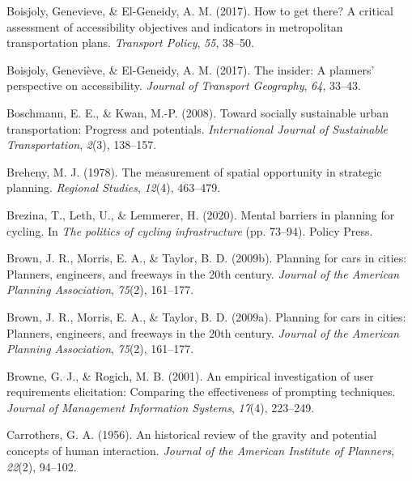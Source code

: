 \documentclass[12pt,twoside]{reedthesis}
\newlength{\cslhangindent}
\newenvironment{CSLReferences}[2] %
 {%
  \setlength{\parindent}{0pt}
  \ifodd #1 \everypar{\setlength{\hangindent}{\cslhangindent}}\ignorespaces\fi
  \ifnum #2 > 0
  \setlength{\parskip}{#2\baselineskip}
  \fi
 }%
 {}
\begin{document}
\begin{CSLReferences}{1}{0}
\leavevmode{}%
Boisjoly, Genevieve, \& El-Geneidy, A. M. (2017). How to get there? A critical assessment of accessibility objectives and indicators in metropolitan transportation plans. \emph{Transport Policy}, \emph{55}, 38--50.

\leavevmode{}%
Boisjoly, Geneviève, \& El-Geneidy, A. M. (2017). The insider: A planners' perspective on accessibility. \emph{Journal of Transport Geography}, \emph{64}, 33--43.

\leavevmode{}%
Boschmann, E. E., \& Kwan, M.-P. (2008). Toward socially sustainable urban transportation: Progress and potentials. \emph{International Journal of Sustainable Transportation}, \emph{2}(3), 138--157.

\leavevmode{}%
Breheny, M. J. (1978). The measurement of spatial opportunity in strategic planning. \emph{Regional Studies}, \emph{12}(4), 463--479.

\leavevmode{}%
Brezina, T., Leth, U., \& Lemmerer, H. (2020). Mental barriers in planning for cycling. In \emph{The politics of cycling infrastructure} (pp. 73--94). Policy Press.

\leavevmode{}%
Brown, J. R., Morris, E. A., \& Taylor, B. D. (2009b). Planning for cars in cities: Planners, engineers, and freeways in the 20th century. \emph{Journal of the American Planning Association}, \emph{75}(2), 161--177.

\leavevmode{}%
Brown, J. R., Morris, E. A., \& Taylor, B. D. (2009a). Planning for cars in cities: Planners, engineers, and freeways in the 20th century. \emph{Journal of the American Planning Association}, \emph{75}(2), 161--177.

\leavevmode{}%
Browne, G. J., \& Rogich, M. B. (2001). An empirical investigation of user requirements elicitation: Comparing the effectiveness of prompting techniques. \emph{Journal of Management Information Systems}, \emph{17}(4), 223--249.

\leavevmode{}%
Carrothers, G. A. (1956). An historical review of the gravity and potential concepts of human interaction. \emph{Journal of the American Institute of Planners}, \emph{22}(2), 94--102.


\end{CSLReferences}
\end{document}
